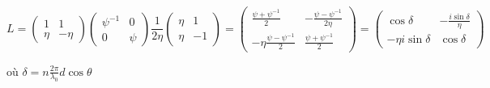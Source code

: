 \documentclass[a4paper,english]{article}
\begin{document}
\begin{dmath}
L = \begin{pmatrix} 1 & 1 \\ \eta & -\eta \end{pmatrix} \begin{pmatrix} \psi^{-1} & 0 \\ 0 & \psi \end{pmatrix} \frac{1}{2 \eta} \begin{pmatrix} \eta & 1 \\ \eta & -1 \end{pmatrix} =
\begin{pmatrix} \frac{\psi + \psi^{-1}}{2} & -\frac{\psi - \psi^{-1}}{2\eta} \\ -\eta\frac{\psi - \psi^{-1}}{2} & \frac{\psi + \psi^{-1}}{2} \end{pmatrix} =
\begin{pmatrix} \cos \delta & -\frac{i \sin \delta}{\eta} \\ -\eta i \sin \delta & \cos \delta \end{pmatrix}
\end{dmath}

où $\delta = n \frac{2\pi}{\lambda_0} d \cos \theta$
\end{document}
